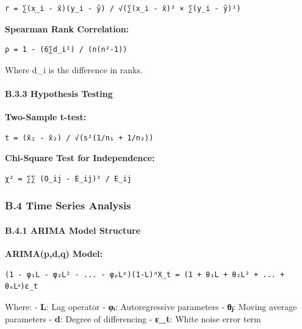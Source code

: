 \documentclass[12pt,a4paper]{article}
\begin{document}
{{{{{\begin{verbatim}
r = ∑(x_i - x̄)(y_i - ȳ) / √(∑(x_i - x̄)² × ∑(y_i - ȳ)²)
\end{verbatim}

\textbf{Spearman Rank Correlation:}

\begin{verbatim}
ρ = 1 - (6∑d_i²) / (n(n²-1))
\end{verbatim}

Where d\_i is the difference in ranks.

\hypertarget{b.3.3-hypothesis-testing}{%
\paragraph{B.3.3 Hypothesis Testing}\label{b.3.3-hypothesis-testing}}

\textbf{Two-Sample t-test:}

\begin{verbatim}
t = (x̄₁ - x̄₂) / √(s²(1/n₁ + 1/n₂))
\end{verbatim}

\textbf{Chi-Square Test for Independence:}

\begin{verbatim}
χ² = ∑∑ (O_ij - E_ij)² / E_ij
\end{verbatim}

\hypertarget{b.4-time-series-analysis}{%
\subsubsection{B.4 Time Series
Analysis}\label{b.4-time-series-analysis}}

\hypertarget{b.4.1-arima-model-structure}{%
\paragraph{B.4.1 ARIMA Model
Structure}\label{b.4.1-arima-model-structure}}

\textbf{ARIMA(p,d,q) Model:}

\begin{verbatim}
(1 - φ₁L - φ₂L² - ... - φₚLᵖ)(1-L)ᵈX_t = (1 + θ₁L + θ₂L² + ... + θₑLᵠ)ε_t
\end{verbatim}

Where: - \textbf{L}: Lag operator - \textbf{φᵢ}: Autoregressive
parameters - \textbf{θⱼ}: Moving average parameters - \textbf{d}: Degree
of differencing - \textbf{ε\_t}: White noise error term

\hypertarget{b.4.2-seasonal-decomposition}{%
}}}}}}
\end{document}
